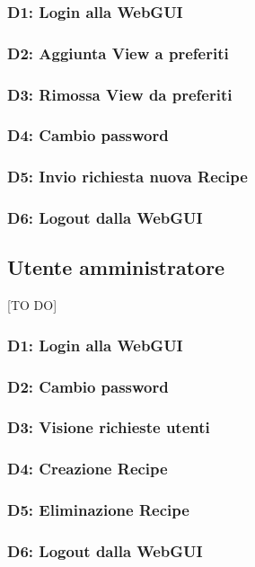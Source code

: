 
\subsubsection{D1: Login alla WebGUI}
\subsubsection{D2: Aggiunta View a preferiti}
\subsubsection{D3: Rimossa View da preferiti}
\subsubsection{D4: Cambio password}
\subsubsection{D5: Invio richiesta nuova Recipe}
\subsubsection{D6: Logout dalla WebGUI}



	\pagebreak

	\subsection{Utente amministratore} %
	\label{sub:utente_amministratore}
	[TO DO]





\subsubsection{D1: Login alla WebGUI}
\subsubsection{D2: Cambio password}
\subsubsection{D3: Visione richieste utenti}
\subsubsection{D4: Creazione Recipe}
\subsubsection{D5: Eliminazione Recipe}
\subsubsection{D6: Logout dalla WebGUI}



